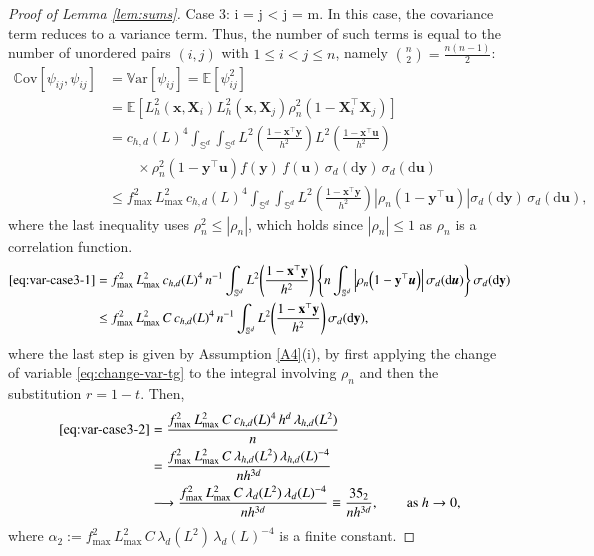 \documentclass[12pt]{report} %
\newcommand{\bX}{\mathbf{X}}
\newcommand{\bx}{\mathbf{x}}
\newcommand{\by}{\mathbf{y}}
\newcommand{\bu}{\boldsymbol{u}}
\newcommand{\sigmad}{\sigma_{d}}
\newcommand{\rd}{\mathrm{d}}
\newcommand{\Sd}{\mathbb{S}^{d}}
\newcommand{\lc}{\left[}
\newcommand{\rc}{\right]}
\newcommand{\V}[1]{\mathbb{V}\mathrm{ar}\lc #1\rc}
\newcommand{\Cov}[2]{\mathbb{C}\mathrm{ov}\lc #1,#2\rc}
\begin{document}
\begin{proof}[Proof of Lemma \ref{lem:sums}]
Case 3: i = j < j = m. In this case, the covariance term reduces to a variance term. Thus, the number of such terms is equal to the number of unordered pairs $(i,j)$ with $1\leq i<j\leq n$, namely $ \binom{n}{2} = \frac{n(n-1)}{2}$:
\begin{align}
\Cov{\psi_{ij}}{\psi_{ij}}
&= \V{\psi_{ij}}
 = \mathbb{E}\!\left[\psi_{ij}^2\right] \nonumber \\
&= \mathbb{E}\!\left[
    L_h^2(\bx, \bX_i)
    L_h^2(\bx, \bX_j)
    \rho_n^2(1 - \bX_i^\top \bX_j)
  \right] \nonumber \\
&= c_{h,d}(L)^4
  \int_{\Sd} \int_{\Sd}
    L^2\!\left(\frac{1 - \bx^\top \by}{h^2}\right)
    L^2\!\left(\frac{1 - \bx^\top \bu}{h^2}\right) \nonumber \\
&\qquad \times
    \rho_n^2\!\left(1 - \by^\top \bu\right)
    f(\by)\, f(\bu) \,
    \sigmad(\rd\by)\,
    \sigmad(\rd\bu) \nonumber \\
&\leq f_{\max}^2\, L_{\max}^2\, c_{h,d}(L)^4
  \int_{\Sd} \int_{\Sd}
    L^2\!\left(\frac{1 - \bx^\top \by}{h^2}\right)
    \left|\rho_n\!\left(1 - \by^\top \bu\right)\right|
    \sigmad(\rd\by)\,
    \sigmad(\rd\bu),
\label{eq:var-case3-1}
\end{align}
where the last inequality uses $\rho_n^2 \leq |\rho_n|$, which holds since $|\rho_n| \leq 1$ as $\rho_n$ is a correlation function. 
\begin{align}
\eqref{eq:var-case3-1}
&= f_{\max}^2\, L_{\max}^2\, c_{h,d}(L)^4\, n^{-1}
  \int_{\Sd}
    L^2\!\left(\frac{1 - \bx^\top \by}{h^2}\right)
    \left\{
      n \int_{\Sd}
        \left|\rho_n\!\left(1 - \by^\top \bu\right)\right|
        \sigmad(\rd\bu)
    \right\}
    \sigmad(\rd\by) \nonumber \\
&\leq f_{\max}^2\, L_{\max}^2\, C\, c_{h,d}(L)^4\, n^{-1}
  \int_{\Sd}
    L^2\!\left(\frac{1 - \bx^\top \by}{h^2}\right)
    \sigmad(\rd\by), \label{eq:var-case3-2}
\end{align}
where the last step is given by Assumption \ref{A4}(i), by first applying the change of variable \eqref{eq:change-var-tg} to the integral involving $\rho_n$ and then the substitution $r = 1 - t$. Then,
\begin{align*}
\eqref{eq:var-case3-2}&=
  \frac{
    f_{\max}^2\, L_{\max}^2\, C\, c_{h,d}(L)^4\,
    h^d\, \lambda_{h,d}(L^2)
  }{n} \nonumber \\
&=
  \frac{
    f_{\max}^2\, L_{\max}^2\, C\,
    \lambda_{h,d}(L^2)\,
    \lambda_{h,d}(L)^{-4}
  }{n h^{3d}} \nonumber \\
&\longrightarrow
  \frac{
    f_{\max}^2\, L_{\max}^2\, C\,
    \lambda_d(L^2)\,
    \lambda_d(L)^{-4}
  }{n h^{3d}}
  \equiv \frac{\alpha_2}{n h^{3d}},
  \qquad \text{as } h \to 0,
\end{align*}
where $\alpha_2 := f_{\max}^2\, L_{\max}^2\, C\,
\lambda_{d}(L^2)\,\lambda_{d}(L)^{-4}$ is a finite constant.


\end{proof}
\end{document}
